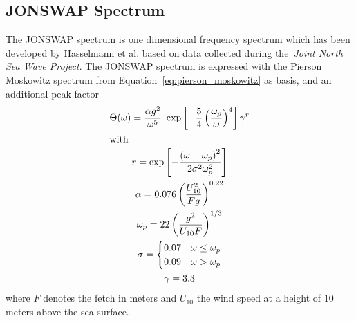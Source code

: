 \subsection{JONSWAP Spectrum}
\label{sec:jonswap}
%
The JONSWAP spectrum is one dimensional frequency spectrum  which has been 
developed by Hasselmann et al.\cite{article:Hasselman1973} based on data 
collected during the~\emph{Joint North Sea Wave Project}. The JONSWAP spectrum 
is expressed with the Pierson Moskowitz spectrum from 
Equation~\ref{eq:pierson_moskowitz} as basis, and an additional peak factor
\begin{subequations}
\begin{gather}
 \Theta(\omega) = \frac{\alpha
g^2}{\omega^5}~\exp\left[-\frac{5}{4}\left(\frac{\omega_p}{\omega}
\right)^4\right]\gamma^r\\
\intertext{with}
r = \exp\left[-\frac{\left(\omega -
\omega_p\right)^2}{2\sigma^2\omega_p^2}\right] \\
\alpha = 0.076\left(\frac{U_{10}^2}{Fg}\right)^{0.22} \\
\omega_{p} = 22\left(\frac{g^2}{U_{10}F}\right)^{1/3} \\
\sigma = \begin{cases}
	0.07 & \omega\leq\omega_p\\
	0.09 & \omega > \omega_p
    \end{cases} \\
\gamma = 3.3
\end{gather}
\end{subequations}
where $F$ denotes the fetch in meters and $U_{10}$ the wind speed at a height
of 10 meters above the sea surface.\\

